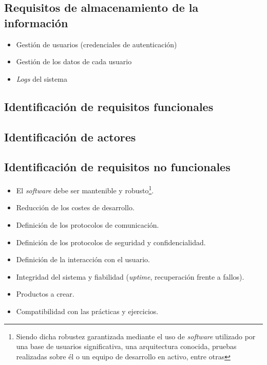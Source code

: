 \subsection{Requisitos de almacenamiento de la información}

\begin{itemize}
  \item Gestión de usuarios (credenciales de autenticación)
  \item Gestión de los datos de cada usuario
  \item \textit{Logs} del sistema
\end{itemize}

\subsection{Identificación de requisitos funcionales}


\subsection{Identificación de actores}

\subsection{Identificación de requisitos no funcionales}

\begin{itemize}
  \item El \textit{software} debe ser mantenible y robusto\footnote{Siendo dicha robustez garantizada mediante el uso de \textit{software} utilizado por una base de usuarios significativa, una arquitectura conocida, pruebas realizadas sobre él o un equipo de desarrollo en activo, entre otras}.
  \item Reducción de los costes de desarrollo.
  \item Definición de los protocolos de comunicación.
  \item Definición de los protocolos de seguridad y confidencialidad.
  \item Definición de la interacción con el usuario.
  \item Integridad del sistema y fiabilidad (\textit{uptime}, recuperación frente a fallos).
  \item Productos a crear.
  \item Compatibilidad con las prácticas y ejercicios.
\end{itemize}
